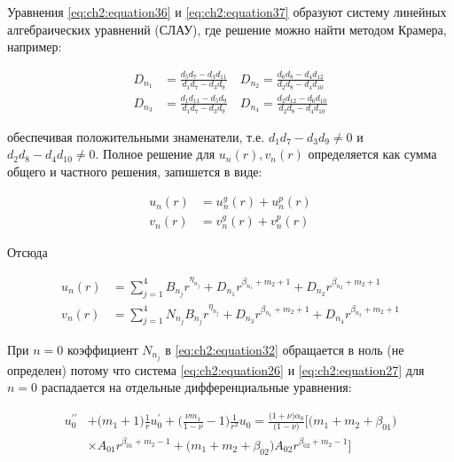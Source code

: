 Уравнения \cref{eq:ch2:equation36} и \cref{eq:ch2:equation37} образуют систему линейных алгебраических уравнений (СЛАУ), где решение можно найти методом Крамера, например:

\begin{equation}
\label{eq:ch2:equation38}
\begin{split}
	D_{n_1} & = \frac{d_5 d_7 - d_3 d_{11} }{d_1 d_7 - d_3 d_{9}} \quad  D_{n_2}  = \frac{d_6 d_8 - d_4 d_{12} }{d_2 d_8 - d_4 d_{10}}\\
	D_{n_3} & = \frac{d_1 d_{11} - d_5 d_{9} }{d_1 d_7 - d_3 d_{9}} \quad  D_{n_4}  = \frac{d_2 d_{12} - d_6 d_{10} }{d_2 d_8 - d_4 d_{10}}
\end{split}
\end{equation}

обеспечивая положительными знаменатели, т.е. \( d_1 d_7 - d_3 d_{9} \ne 0\) и \( d_2 d_8 - d_4 d_{10} \ne 0\). Полное решение для  \(u_n(r), v_n(r) \) определяется как сумма общего и частного решения, запишется в виде:

\begin{equation}
\label{eq:ch2:equation39}
\begin{split}
	u_n(r) & =u_n^g(r)+u_n^p(r)\\
	v_n(r) &= v_n^g(r)+v_n^p(r)
\end{split}
\end{equation}

Отсюда

\begin{equation}
\label{eq:ch2:equation40}
\begin{split}
	u_n(r) & =\sum_{j=1}^4 B_{n_j} r^{\eta_{n_j}} + D_{n_1} r^{\beta_{n_1} +m_2 +1} +D_{n_2} r^{\beta_{n_2} +m_2 +1} \\
	v_n(r) &= \sum_{j=1}^4 N_{n_j} B_{n_j} r^{\eta_{n_j}} + D_{n_3} r^{\beta_{n_1} +m_2 +1} +D_{n_4} r^{\beta_{n_2} +m_2 +1} 
\end{split}
\end{equation}

При \( n=0 \) коэффициент \(N_{n_j}\) в \cref{eq:ch2:equation32} обращается в ноль (не определен) потому что система \cref{eq:ch2:equation26} и \cref{eq:ch2:equation27} для \( n=0 \) распадается на отдельные дифференциальные уравнения:

\begin{equation}
\label{eq:ch2:equation41}
\begin{split}
	u_0^{\prime \prime} &+ \big ( m_1 +1 \big )\frac{1}{r} u_0^{\prime} + \big ( \frac{\nu m_1}{1-\nu} -1 \big ) \frac{1}{r^2} u_0 = \frac{\big (1+\nu \big )\alpha_0}{\big (1-\nu \big )} \big [ \big ( m_1+m_2+\beta_{01} \big ) \\
	& \times A_{01} r^{\beta_{01}+m_2 -1} + \big ( m_1 + m_2 + \beta_{02} \big ) A_{02} r^{\beta_{02}+m_2 -1}\big ]
\end{split}
\end{equation}

